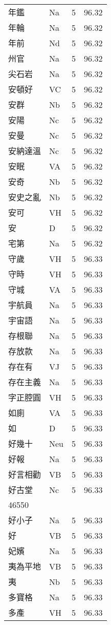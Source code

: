 \documentclass[twocolumn]{book}
\begin{document}
\begin{supertabular}{llrr}
年鑑 & Na & 5 &  96.32\\
年輪 & Na & 5 &  96.32\\
年前 & Nd & 5 &  96.32\\
州官 & Na & 5 &  96.32\\
尖石岩 & Na & 5 &  96.32\\
安頓好 & VC & 5 &  96.32\\
安群 & Nb & 5 &  96.32\\
安陽 & Nc & 5 &  96.32\\
安曼 & Nc & 5 &  96.32\\
安納達溫 & Nc & 5 &  96.32\\
安眠 & VA & 5 &  96.32\\
安奇 & Nb & 5 &  96.32\\
安史之亂 & Nb & 5 &  96.32\\
安可 & VH & 5 &  96.32\\
安 & D & 5 &  96.32\\
宅第 & Na & 5 &  96.32\\
守歲 & VH & 5 &  96.33\\
守時 & VH & 5 &  96.33\\
守城 & VA & 5 &  96.33\\
宇航員 & Na & 5 &  96.33\\
宇宙語 & Na & 5 &  96.33\\
存根聯 & Na & 5 &  96.33\\
存放款 & Na & 5 &  96.33\\
存在有 & VJ & 5 &  96.33\\
存在主義 & Na & 5 &  96.33\\
字正腔圓 & VH & 5 &  96.33\\
如廁 & VA & 5 &  96.33\\
如 & D & 5 &  96.33\\
好幾十 & Neu & 5 &  96.33\\
好報 & Na & 5 &  96.33\\
好言相勸 & VB & 5 &  96.33\\
好古堂 & Nc & 5 &  96.33\\
46550\\
好小子 & Na & 5 &  96.33\\
好 & VB & 5 &  96.33\\
妃嬪 & Na & 5 &  96.33\\
夷為平地 & VB & 5 &  96.33\\
夷 & Nb & 5 &  96.33\\
多寶格 & Na & 5 &  96.33\\
多產 & VH & 5 &  96.33\\

\end{supertabular}
\end{document}
